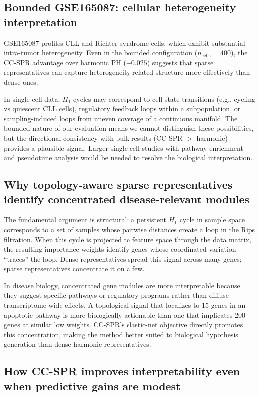 \documentclass[11pt]{article}
\begin{document}
\subsection{Bounded GSE165087: cellular heterogeneity interpretation}

GSE165087 profiles CLL and Richter syndrome cells, which exhibit substantial intra-tumor heterogeneity.
Even in the bounded configuration ($n_{\text{cells}} = 400$), the CC-SPR advantage over harmonic PH ($+0.025$) suggests that sparse representatives can capture heterogeneity-related structure more effectively than dense ones.

In single-cell data, $H_1$ cycles may correspond to cell-state transitions (e.g., cycling vs quiescent CLL cells), regulatory feedback loops within a subpopulation, or sampling-induced loops from uneven coverage of a continuous manifold.
The bounded nature of our evaluation means we cannot distinguish these possibilities, but the directional consistency with bulk results (CC-SPR $>$ harmonic) provides a plausible signal.
Larger single-cell studies with pathway enrichment and pseudotime analysis would be needed to resolve the biological interpretation.

\subsection{Why topology-aware sparse representatives identify concentrated disease-relevant modules}

The fundamental argument is structural: a persistent $H_1$ cycle in sample space corresponds to a set of samples whose pairwise distances create a loop in the Rips filtration.
When this cycle is projected to feature space through the data matrix, the resulting importance weights identify genes whose coordinated variation ``traces'' the loop.
Dense representatives spread this signal across many genes; sparse representatives concentrate it on a few.

In disease biology, concentrated gene modules are more interpretable because they suggest specific pathways or regulatory programs rather than diffuse transcriptome-wide effects.
A topological signal that localizes to 15 genes in an apoptotic pathway is more biologically actionable than one that implicates 200 genes at similar low weights.
CC-SPR's elastic-net objective directly promotes this concentration, making the method better suited to biological hypothesis generation than dense harmonic representatives.

\subsection{How CC-SPR improves interpretability even when predictive gains are modest}
\end{document}
